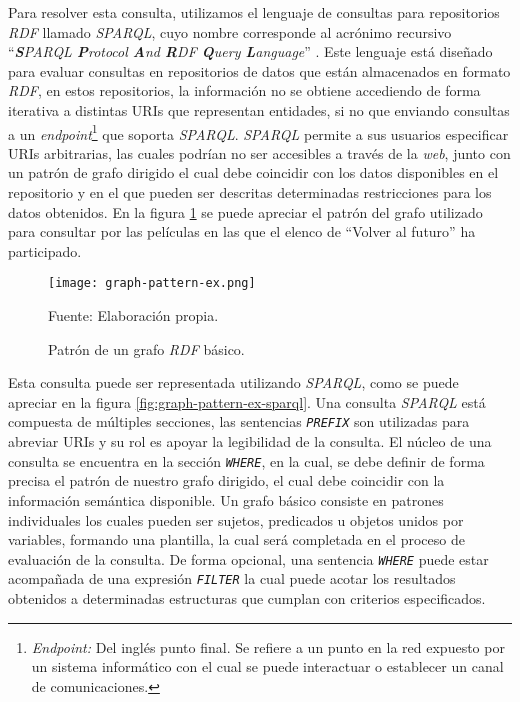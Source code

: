 Para resolver esta consulta, utilizamos el lenguaje de consultas para
repositorios \textit{RDF} llamado \textit{SPARQL}, cuyo nombre corresponde al
acrónimo recursivo ``\textit{\textbf{S}PARQL \textbf{P}rotocol \textbf{A}nd
\textbf{R}DF \textbf{Q}uery \textbf{L}anguage}'' \cite{world2013sparql}. Este
lenguaje está diseñado para evaluar consultas en repositorios de datos que están
almacenados en formato \textit{RDF}, en estos repositorios, la información no se
obtiene accediendo de forma iterativa a distintas URIs que representan
entidades, si no que enviando consultas a un
\textit{endpoint}\footnote{\textit{Endpoint:} Del inglés punto final. Se refiere
a un punto en la red expuesto por un sistema informático con el cual se puede
interactuar o establecer un canal de comunicaciones.} que soporta
\textit{SPARQL}. \textit{SPARQL} permite a sus usuarios especificar URIs
arbitrarias, las cuales podrían no ser accesibles a través de la \textit{web},
junto con un patrón de grafo dirigido el cual debe coincidir con los datos
disponibles en el repositorio y en el que pueden ser descritas determinadas
restricciones para los datos obtenidos. En la figura \ref{fig:graph-pattern-ex}
se puede apreciar el patrón del grafo utilizado para consultar por las películas
en las que el elenco de ``Volver al futuro'' ha participado.

\begin{figure}
    \centering
    \texttt{[image: graph-pattern-ex.png]}
    \caption{Patrón de un grafo \textit{RDF} básico. } Fuente: Elaboración
    propia.
    \label{fig:graph-pattern-ex}
\end{figure}

Esta consulta puede ser representada utilizando \textit{SPARQL}, como se puede
apreciar en la figura \ref{fig:graph-pattern-ex-sparql}. Una consulta
\textit{SPARQL} está compuesta de múltiples secciones, las sentencias
\textit{\texttt{PREFIX}} son utilizadas para abreviar URIs y su rol es apoyar la
legibilidad de la consulta. El núcleo de una consulta se encuentra en la sección
\textit{\texttt{WHERE}}, en la cual, se debe definir de forma precisa el patrón
de nuestro grafo dirigido, el cual debe coincidir con la información semántica
disponible. Un grafo básico consiste en patrones individuales los cuales pueden
ser sujetos, predicados u objetos unidos por variables, formando una plantilla,
la cual será completada en el proceso de evaluación de la consulta. De forma
opcional, una sentencia \textit{\texttt{WHERE}} puede estar acompañada de una
expresión \textit{\texttt{FILTER}} la cual puede acotar los resultados obtenidos
a determinadas estructuras que cumplan con criterios especificados.

